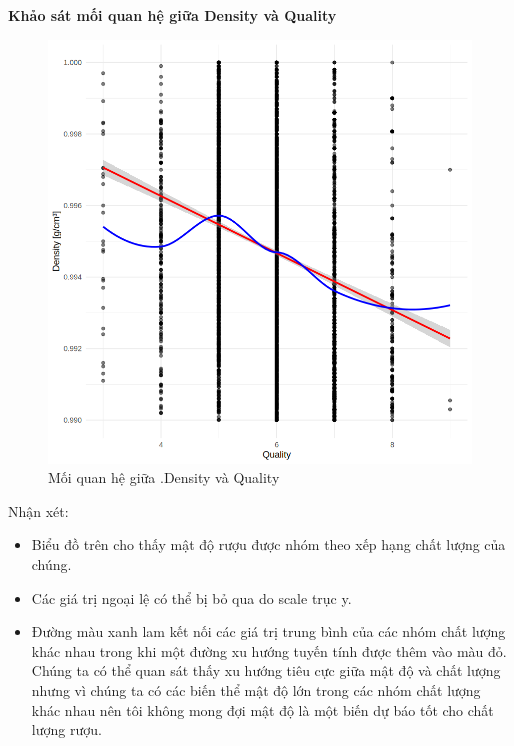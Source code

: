 \textbf{Khảo sát mối quan hệ giữa Density và Quality}
\begin{figure}[H]
    \centering
    \includegraphics[width=0.75\columnwidth]{wine_colors/wine_density_quality.png}
    \caption{Mối quan hệ giữa .Density và Quality}
    \label{fig:wine_density_quality}
\end{figure}
Nhận xét:
\begin{itemize}
    \item Biểu đồ trên cho thấy mật độ rượu được nhóm theo xếp hạng chất lượng của chúng. 
    \item Các giá trị ngoại lệ có thể bị bỏ qua do scale trục y. 
    \item Đường màu xanh lam kết nối các giá trị trung bình của các nhóm chất lượng khác nhau trong khi một đường xu hướng tuyến tính được thêm vào màu đỏ. Chúng ta có thể quan sát thấy xu hướng tiêu cực giữa mật độ và chất lượng nhưng vì chúng ta có các biến thể mật độ lớn trong các nhóm chất lượng khác nhau nên tôi không mong đợi mật độ là một biến dự báo tốt cho chất lượng rượu.
\end{itemize}


